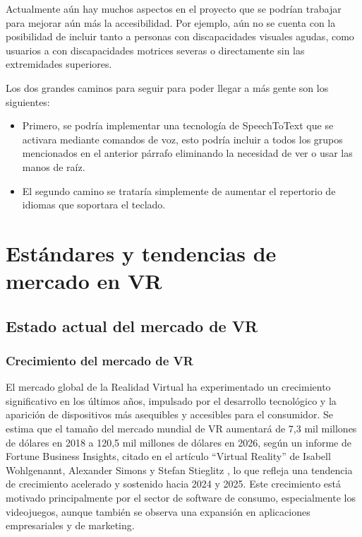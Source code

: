 Actualmente aún hay muchos aspectos en el proyecto que se podrían trabajar para mejorar aún más la accesibilidad. Por ejemplo, aún no se cuenta con la posibilidad de incluir tanto a personas con discapacidades visuales agudas, como usuarios a con discapacidades motrices severas o directamente sin las extremidades superiores.

Los dos grandes caminos para seguir para poder llegar a más gente son los siguientes:
\begin{itemize}
	\item Primero, se podría implementar una tecnología de SpeechToText que se activara mediante comandos de voz, esto podría incluir a todos los grupos mencionados en el anterior párrafo eliminando la necesidad de ver o usar las manos de raíz.
	\item El segundo camino se trataría simplemente de aumentar el repertorio de idiomas que soportara el teclado.
\end{itemize}


\section{Estándares y tendencias de mercado en VR}

\subsection{Estado actual del mercado de VR}

\subsubsection{Crecimiento del mercado de VR}

El mercado global de la Realidad Virtual ha experimentado un crecimiento significativo en los últimos años, impulsado por el desarrollo tecnológico y la aparición de dispositivos más asequibles y accesibles para el consumidor. Se estima que el tamaño del mercado mundial de VR aumentará de 7,3 mil millones de dólares en 2018 a 120,5 mil millones de dólares en 2026, según un informe de Fortune Business Insights, citado en el artículo ``Virtual Reality'' de Isabell Wohlgenannt, Alexander Simons y Stefan Stieglitz \cite{Wohlgenannt2020Virtual}, lo que refleja una tendencia de crecimiento acelerado y sostenido hacia 2024 y 2025. Este crecimiento está motivado principalmente por el sector de software de consumo, especialmente los videojuegos, aunque también se observa una expansión en aplicaciones empresariales y de marketing.\cite{Wohlgenannt2020Virtual} \cite{Wedel2020Virtual}


